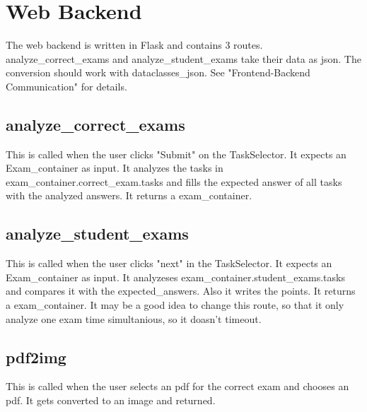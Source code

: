 \author{Paul Hoffmann}
\graphicspath{ {./src/chapters/developer/media/} }

\chapter{Web Backend}
The web backend is written in Flask and contains 3 routes.
analyze\_correct\_exams and analyze\_student\_exams take
their data as json. The conversion should work with
dataclasses\_json. See "Frontend-Backend Communication" for
details. 

\section{analyze\_correct\_exams}
This is called when the user clicks "Submit" on the
TaskSelector. It expects an Exam\_container as input. It
analyzes the tasks in exam\_container.correct\_exam.tasks
and fills the expected answer of all tasks with the
analyzed answers. It returns a exam\_container.

\section{analyze\_student\_exams}
This is called when the user clicks "next" in the
TaskSelector.  It expects an Exam\_container as input. It
analyzeses exam\_container.student\_exams.tasks and compares
it with the expected\_answers. Also it writes the points. It
returns a exam\_container.
It may be a good idea to change this route, so that it only
analyze one exam time simultanious, so it doasn't timeout.

\section{pdf2img}
This is called when the user selects an pdf for the
correct exam and chooses an pdf. It gets converted to an
image and returned.

